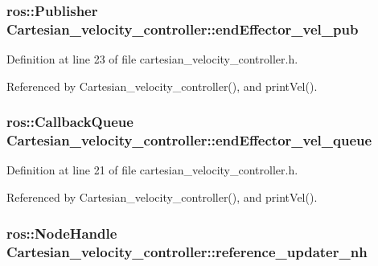 \hypertarget{classCartesian__velocity__controller_ab12287816ae785d3cd6243b3df0cffc6}{
\subsubsection[{end\-Effector\-\_\-vel\-\_\-pub}]{\setlength{\rightskip}{0pt plus 5cm}ros\-::\-Publisher Cartesian\-\_\-velocity\-\_\-controller\-::end\-Effector\-\_\-vel\-\_\-pub\hspace{0.3cm}{\ttfamily [protected]}}}\label{classCartesian__velocity__controller_ab12287816ae785d3cd6243b3df0cffc6}


Definition at line 23 of file cartesian\-\_\-velocity\-\_\-controller.\-h.



Referenced by Cartesian\-\_\-velocity\-\_\-controller(), and print\-Vel().

\hypertarget{classCartesian__velocity__controller_af154b0cda931081b52224eb22e4680f7}{
\subsubsection[{end\-Effector\-\_\-vel\-\_\-queue}]{\setlength{\rightskip}{0pt plus 5cm}ros\-::\-Callback\-Queue Cartesian\-\_\-velocity\-\_\-controller\-::end\-Effector\-\_\-vel\-\_\-queue\hspace{0.3cm}{\ttfamily [protected]}}}\label{classCartesian__velocity__controller_af154b0cda931081b52224eb22e4680f7}


Definition at line 21 of file cartesian\-\_\-velocity\-\_\-controller.\-h.



Referenced by Cartesian\-\_\-velocity\-\_\-controller(), and print\-Vel().

\hypertarget{classCartesian__velocity__controller_a7d04d378a2a6d19870a620883dcd3e09}{
\subsubsection[{reference\-\_\-updater\-\_\-nh}]{\setlength{\rightskip}{0pt plus 5cm}ros\-::\-Node\-Handle Cartesian\-\_\-velocity\-\_\-controller\-::reference\-\_\-updater\-\_\-nh\hspace{0.3cm}{\ttfamily [protected]}}}\label{classCartesian__velocity__controller_a7d04d378a2a6d19870a620883dcd3e09}


